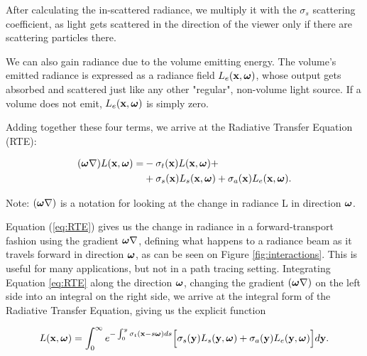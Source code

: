 After calculating the in-scattered radiance, we multiply it with the $\sigma_s$ scattering coefficient, as light gets scattered in the direction of the viewer only if there are scattering particles there.

We can also gain radiance due to the volume emitting energy. The volume's emitted radiance is expressed as a radiance field $L_e(\textbf{x}, \boldsymbol{\omega})$, whose output gets absorbed and scattered just like any other "regular", non-volume light source. If a volume does not emit, $L_e(\textbf{x}, \boldsymbol{\omega})$ is simply zero.

Adding together these four terms, we arrive at the Radiative Transfer Equation (RTE):

\begin{align} 
\begin{aligned}
\label{eq:RTE}
(\boldsymbol{\omega} \nabla)L(\textbf{x},\boldsymbol{\omega}) =&
- \sigma_t(\textbf{x})L(\textbf{x},\boldsymbol{\omega}) +\\
&+ \sigma_s(\textbf{x})L_s(\textbf{x},\boldsymbol{\omega}) + \sigma_a(\textbf{x})L_e(\textbf{x},\boldsymbol{\omega}).
\end{aligned}
\end{align}


Note: $(\boldsymbol{\omega} \nabla)$ is a notation for looking at the change in radiance L in direction $\boldsymbol{\omega}$.

Equation (\ref{eq:RTE}) gives us the change in radiance in a forward-transport fashion using the gradient $\boldsymbol{\omega}\nabla$, defining what happens to a radiance beam as it travels forward in direction $\boldsymbol{\omega}$, as can be seen on Figure \ref{fig:interactions}. This is useful for many applications, but not in a path tracing setting. Integrating Equation \ref{eq:RTE} along the direction $\boldsymbol{\omega}$, changing the gradient $(\boldsymbol{\omega}\nabla)$ on the left side into an integral on the right side, we arrive at the integral form of the Radiative Transfer Equation, giving us the explicit function

\begin{equation}
L(\textbf{x}, \boldsymbol{\omega}) = \int_0^\infty 
e^{-\int_0^y{\sigma_t(\textbf{x}-s\boldsymbol{\omega})}ds}
\Big[
    \sigma_s(\textbf{y})L_s(\textbf{y}, \boldsymbol{\omega}) + \sigma_a(\textbf{y})L_e(\textbf{y}, \boldsymbol{\omega})
\Big]
d\textbf{y}.
\end{equation}


